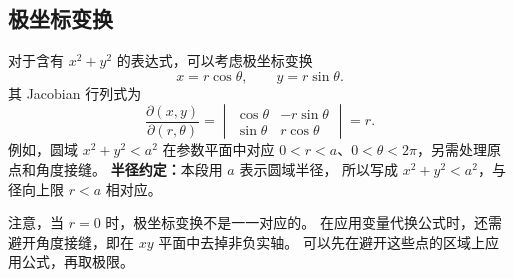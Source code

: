 \subsection*{极坐标变换}

对于含有 $x^2+y^2$ 的表达式，可以考虑极坐标变换
\[
x=r\cos\theta,\qquad y=r\sin\theta.
\]
其 Jacobian 行列式为
\[
\frac{\partial(x,y)}{\partial(r,\theta)}
=\begin{vmatrix}
\cos\theta&-r\sin\theta\\
\sin\theta&r\cos\theta
\end{vmatrix}
=r.
\]
例如，圆域 $x^2+y^2<a^2$ 在参数平面中对应
$0<r<a$、$0<\theta<2\pi$，另需处理原点和角度接缝。
\textbf{半径约定：}本段用 $a$ 表示圆域半径，
所以写成 $x^2+y^2<a^2$，与径向上限 $r<a$ 相对应。

注意，当 $r=0$ 时，极坐标变换不是一一对应的。
在应用变量代换公式时，还需避开角度接缝，即在 $xy$ 平面中去掉非负实轴。
可以先在避开这些点的区域上应用公式，再取极限。

